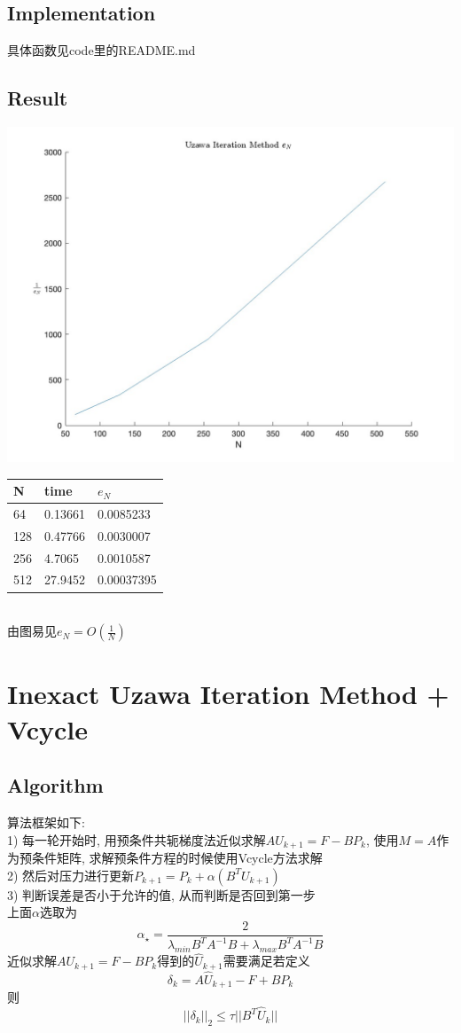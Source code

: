 \documentclass{article}
\begin{document}
\subsection{Implementation}
具体函数见code里的README.md\\
\subsection{Result}
\includegraphics[scale=0.3]{image/UIM.jpg}\\
\begin{tabular}{lll}
N & time & $e_N$ \\ 
\hline 
64 & 0.13661 & 0.0085233 \\ 
128 & 0.47766 & 0.0030007 \\ 
256 & 4.7065 & 0.0010587 \\ 
512 & 27.9452 & 0.00037395 \\ 
\hline 
\end{tabular}\\
由图易见$e_N=O(\frac{1}{N})$
\section{Inexact Uzawa Iteration Method + Vcycle}
\subsection{Algorithm}
算法框架如下:\\
1) 每一轮开始时, 用预条件共轭梯度法近似求解$AU_{k+1}=F-BP_k$, 
使用$M=A$作为预条件矩阵, 求解预条件方程的时候使用Vcycle方法求解\\
2) 然后对压力进行更新$P_{k+1}=P_k+\alpha(B^TU_{k+1})$\\
3) 判断误差是否小于允许的值, 从而判断是否回到第一步\\
上面$\alpha$选取为\\
$$
\alpha_{\star}=\frac{2}{\lambda_{min}{B^TA^{-1}B}+\lambda_{max}{B^TA^{-1}B}}
$$
近似求解$AU_{k+1}=F-BP_k$得到的$\hat{U}_{k+1}$需要满足若定义$$
\delta_k = A\hat{U}_{k+1}-F+BP_k
$$
则
$$
||\delta_k||_2 \leq \tau||B^T\hat{U}_k||
$$
\end{document}
